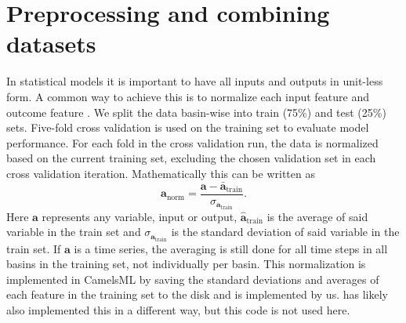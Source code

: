 \section{Preprocessing and combining datasets}
In statistical models it is important to have all inputs and outputs in unit-less 
form. A common way to achieve this is to normalize each input feature and outcome 
feature \citep{elemstatlearn}. 
We split the data basin-wise into train (75\%) and test (25\%) sets. 
Five-fold cross validation is used on the training set to evaluate model performance.
For each fold in the cross validation run, the data is normalized based on the current 
training set, excluding the chosen validation set in each cross validation iteration.
Mathematically this can be written as 
\begin{equation}
    \bm{a}_\text{norm} = \frac{\bm{a} - \bar{\bm{a}}_\text{train}}{\sigma_{\bm{a}_\text{train}}}. \label{normalization}
\end{equation}
Here $\bm{a}$ represents any variable, input or output, $\hat{\bm{a}}_\text{train}$ is 
the average of said variable in the train set and $\sigma_{\bm{a}_\text{train}}$ is 
the standard deviation of said variable in the train set. If $\bm{a}$ is a time series, 
the averaging is still done for all time steps in all basins in the training set, 
not individually per basin. This normalization is implemented in CamelsML by saving 
the standard deviations and averages of each feature in the training set to the disk 
and is implemented by us. \citet{lstm_third_paper} has likely also implemented this 
in a different way, but this code is not used here.

